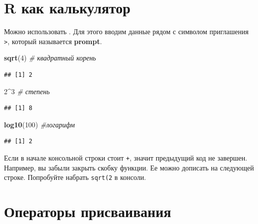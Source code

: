 \documentclass[
]{book}
\newenvironment{Shaded}{\begin{snugshade}}{\end{snugshade}}
\newcommand{\CommentTok}[1]{\textcolor[rgb]{0.56,0.35,0.01}{\textit{#1}}}
\newcommand{\DecValTok}[1]{\textcolor[rgb]{0.00,0.00,0.81}{#1}}
\newcommand{\FunctionTok}[1]{\textcolor[rgb]{0.13,0.29,0.53}{\textbf{#1}}}
\newcommand{\NormalTok}[1]{#1}
\newcommand{\SpecialCharTok}[1]{\textcolor[rgb]{0.81,0.36,0.00}{\textbf{#1}}}
\theoremstyle{definition}
\theoremstyle{definition}
\theoremstyle{definition}
\theoremstyle{definition}
\theoremstyle{remark}
\begin{document}
\hypertarget{r-ux43aux430ux43a-ux43aux430ux43bux44cux43aux443ux43bux44fux442ux43eux440}{%
\section{R как калькулятор}\label{r-ux43aux430ux43a-ux43aux430ux43bux44cux43aux443ux43bux44fux442ux43eux440}}

Можно использовать . Для этого вводим данные рядом с символом приглашения \texttt{\textgreater{}}, который называется \textbf{prompt}.

\begin{Shaded}
\begin{Highlighting}[]
\FunctionTok{sqrt}\NormalTok{(}\DecValTok{4}\NormalTok{) }\CommentTok{\# квадратный корень}
\end{Highlighting}
\end{Shaded}

\begin{verbatim}
## [1] 2
\end{verbatim}

\begin{Shaded}
\begin{Highlighting}[]
\DecValTok{2}\SpecialCharTok{\^{}}\DecValTok{3} \CommentTok{\# степень}
\end{Highlighting}
\end{Shaded}

\begin{verbatim}
## [1] 8
\end{verbatim}

\begin{Shaded}
\begin{Highlighting}[]
\FunctionTok{log10}\NormalTok{(}\DecValTok{100}\NormalTok{) }\CommentTok{\#логарифм}
\end{Highlighting}
\end{Shaded}

\begin{verbatim}
## [1] 2
\end{verbatim}

Если в начале консольной строки стоит \texttt{+}, значит предыдущий код не завершен. Например, вы забыли закрыть скобку функции. Ее можно дописать на следующей строке. Попробуйте набрать \texttt{sqrt(2} в консоли.

\hypertarget{ux43eux43fux435ux440ux430ux442ux43eux440ux44b-ux43fux440ux438ux441ux432ux430ux438ux432ux430ux43dux438ux44f}{%
\section{Операторы присваивания}\label{ux43eux43fux435ux440ux430ux442ux43eux440ux44b-ux43fux440ux438ux441ux432ux430ux438ux432ux430ux43dux438ux44f}}
\end{document}
